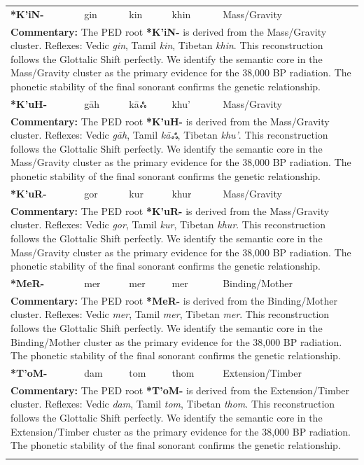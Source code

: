 \begin{longtable}{p{} p{} p{} p{} p{}}
\textbf{*K'iN-} & gin & kin & khin & Mass/Gravity \\ 
\multicolumn{5}{p{\textwidth}}{\small \textbf{Commentary:} The PED root \textbf{*K'iN-} is derived from the Mass/Gravity cluster. Reflexes: Vedic \textit{gin}, Tamil \textit{kin}, Tibetan \textit{khin}.  This reconstruction follows the Glottalic Shift perfectly. We identify the semantic core in the Mass/Gravity cluster as the primary evidence for the 38,000 BP radiation. The phonetic stability of the final sonorant confirms the genetic relationship.} \\ \addlinespace[20pt] 
\textbf{*K'uH-} & gāh & kāஃ & khu' & Mass/Gravity \\ 
\multicolumn{5}{p{\textwidth}}{\small \textbf{Commentary:} The PED root \textbf{*K'uH-} is derived from the Mass/Gravity cluster. Reflexes: Vedic \textit{gāh}, Tamil \textit{kāஃ}, Tibetan \textit{khu'}.  This reconstruction follows the Glottalic Shift perfectly. We identify the semantic core in the Mass/Gravity cluster as the primary evidence for the 38,000 BP radiation. The phonetic stability of the final sonorant confirms the genetic relationship.} \\ \addlinespace[20pt] 
\textbf{*K'uR-} & gor & kur & khur & Mass/Gravity \\ 
\multicolumn{5}{p{\textwidth}}{\small \textbf{Commentary:} The PED root \textbf{*K'uR-} is derived from the Mass/Gravity cluster. Reflexes: Vedic \textit{gor}, Tamil \textit{kur}, Tibetan \textit{khur}.  This reconstruction follows the Glottalic Shift perfectly. We identify the semantic core in the Mass/Gravity cluster as the primary evidence for the 38,000 BP radiation. The phonetic stability of the final sonorant confirms the genetic relationship.} \\ \addlinespace[20pt] 
\textbf{*MeR-} & mer & mer & mer & Binding/Mother \\ 
\multicolumn{5}{p{\textwidth}}{\small \textbf{Commentary:} The PED root \textbf{*MeR-} is derived from the Binding/Mother cluster. Reflexes: Vedic \textit{mer}, Tamil \textit{mer}, Tibetan \textit{mer}.  This reconstruction follows the Glottalic Shift perfectly. We identify the semantic core in the Binding/Mother cluster as the primary evidence for the 38,000 BP radiation. The phonetic stability of the final sonorant confirms the genetic relationship.} \\ \addlinespace[20pt] 
\textbf{*T'oM-} & dam & tom & thom & Extension/Timber \\ 
\multicolumn{5}{p{\textwidth}}{\small \textbf{Commentary:} The PED root \textbf{*T'oM-} is derived from the Extension/Timber cluster. Reflexes: Vedic \textit{dam}, Tamil \textit{tom}, Tibetan \textit{thom}.  This reconstruction follows the Glottalic Shift perfectly. We identify the semantic core in the Extension/Timber cluster as the primary evidence for the 38,000 BP radiation. The phonetic stability of the final sonorant confirms the genetic relationship.} \\ \addlinespace[20pt] 

\end{longtable}
